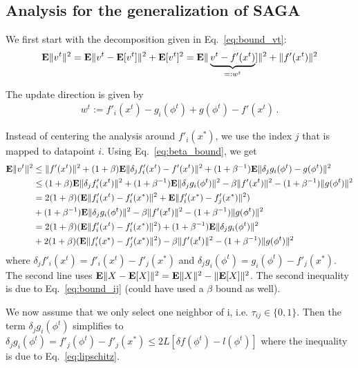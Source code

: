 \documentclass{article}
\newcommand{\E}{{\bf E}}
\begin{document}
\newpage
\subsection*{Analysis for the generalization of SAGA}

We first start with the decomposition given in Eq.~\ref{eq:bound_vt}: 
\begin{align}
\E \| v^t \|^2 = \E \| v^t - \E[v^t] \|^2 + \E[v^t]^2
= \E \| \underbrace{v^t - f'(x^t)}_{=:w^t}  ] \|^2 + \| f'(x^t)\|^2
\end{align}

The update direction is given by
\begin{align}
w^t := f'_i(x^t) - g_i(\phi^t) + g(\phi^t) - f'(x^t) \,. 
\end{align}

Instead of centering the analysis around $f'_i(x^*)$, we use the index $j$ that is mapped to datapoint $i$. Using Eq.~\ref{eq:beta_bound}, we get
\begin{align}
\nonumber
\E \| v^t \|^2 &\leq \| f'(x^t) \|^2 + (1+\beta) \E \| \delta_j f'_i(x^t) - f'(x^t)\|^2 + (1+\beta^{-1}) \E \|  \delta_j g_i(\phi^t)  - g(\phi^t)\|^2 \nonumber \\
& \leq (1+\beta) \E \| \delta_j f'_i(x^t) \|^2 + (1+\beta^{-1}) \E \|  \delta_j g_i(\phi^t) \|^2 -  \beta \|f'(x^t) \|^2 - (1+\beta^{-1}) \| g(\phi^t) \|^2 \nonumber \\
& = 2 (1+\beta) ( \E\| f'_i(x^t) - f'_i(x^*) \|^2 + \E \| f'_i(x^*) - f'_j(x^*)\|^2 ) \nonumber \\
&+ (1+\beta^{-1})  \E \|  \delta_j g_i(\phi^t) \|^2
- \beta \|f'(x^t) \|^2 - (1+\beta^{-1}) \| g(\phi^t) \|^2 \nonumber \\
&= 2 (1+\beta) ( \E\| f'_i(x^t) - f'_i(x^*) \|^2)
+ (1+\beta^{-1})  \E \|  \delta_j g_i(\phi^t) \|^2 \nonumber \\
& + 2 (1 + \beta) (\E \| f'_i(x^*) - f'_j(x^*)\|^2 )
- \beta \|f'(x^t) \|^2 - (1+\beta^{-1}) \| g(\phi^t) \|^2
\end{align}
where $\delta_j f'_i(x^t) = f'_i(x^t) - f'_j(x^*)$ and $\delta_j
g_i(\phi^t) = g_i(\phi^t) - f'_j(x^*)$. The second line uses $\E \| X
- \E[X] \|^2 = \E \| X \|^2 - \| \E[X] \|^2$. The second inequality is due to
Eq.~\ref{eq:bound_ij} (could have used a $\beta$ bound as well).

We now assume that we only select one neighbor of i, i.e. $\tau_{ij}
\in \{0,1\}$. Then the term $\delta_j g_i(\phi^t)$ simplifies to
$\delta_j g_i(\phi^t) = f'_j(\phi^t) - f'_j(x^*) \leq 2L [\delta
  f(\phi^t) - l(\phi^t)]$ where the inequality is due to Eq.~\ref{eq:lipschitz}.
\end{document}
